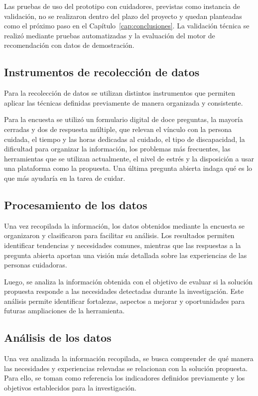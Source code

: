 Las pruebas de uso del prototipo con cuidadores, previstas como instancia de validación, no se realizaron dentro del plazo del proyecto y quedan planteadas como el próximo paso en el Capítulo~\ref{cap:conclusiones}. La validación técnica se realizó mediante pruebas automatizadas y la evaluación del motor de recomendación con datos de demostración.

\subsection{Instrumentos de recolección de datos}

Para la recolección de datos se utilizan distintos instrumentos que permiten aplicar las técnicas definidas previamente de manera organizada y consistente.

Para la encuesta se utilizó un formulario digital de doce preguntas, la mayoría cerradas y dos de respuesta múltiple, que relevan el vínculo con la persona cuidada, el tiempo y las horas dedicadas al cuidado, el tipo de discapacidad, la dificultad para organizar la información, los problemas más frecuentes, las herramientas que se utilizan actualmente, el nivel de estrés y la disposición a usar una plataforma como la propuesta. Una última pregunta abierta indaga qué es lo que más ayudaría en la tarea de cuidar.

\subsection{Procesamiento de los datos}

Una vez recopilada la información, los datos obtenidos mediante la encuesta se organizaron y clasificaron para facilitar su análisis. Los resultados permiten identificar tendencias y necesidades comunes, mientras que las respuestas a la pregunta abierta aportan una visión más detallada sobre las experiencias de las personas cuidadoras.

Luego, se analiza la información obtenida con el objetivo de evaluar si la solución propuesta responde a las necesidades detectadas durante la investigación. Este análisis permite identificar fortalezas, aspectos a mejorar y oportunidades para futuras ampliaciones de la herramienta.

\subsection{Análisis de los datos}

Una vez analizada la información recopilada, se busca comprender de qué manera las necesidades y experiencias relevadas se relacionan con la solución propuesta. Para ello, se toman como referencia los indicadores definidos previamente y los objetivos establecidos para la investigación.

